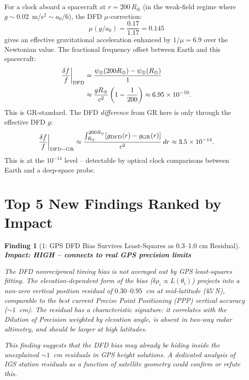 \documentclass[aps,prd,twocolumn,superscriptaddress,nofootinbib]{revtex4-2}
\newtheorem{finding}{Finding}
\begin{document}
For a clock aboard a spacecraft at $r = 200\,R_\oplus$ (in the weak-field
regime where $g \sim 0.02$~m/s$^2 \sim a_0/6$), the DFD $\mu$-correction:
\begin{equation}
\mu(g/a_0) = \frac{0.17}{1.17} = 0.145
\end{equation}
gives an effective gravitational acceleration enhanced by $1/\mu = 6.9$
over the Newtonian value. The fractional frequency offset between Earth
and this spacecraft:
\begin{align}
\frac{\delta f}{f}\bigg|_{\rm DFD}
&= \frac{\psi_\oplus(200R_\oplus) - \psi_\oplus(R_\oplus)}{1} \nonumber\\
&\approx \frac{g R_\oplus}{c^2}
  \left(1 - \frac{1}{200}\right)
  \approx 6.95\times10^{-10}.
\end{align}
This is GR-standard. The DFD \emph{difference} from GR here is only
through the effective DFD $g$:
\begin{equation}
\frac{\delta f}{f}\bigg|_{\rm DFD-GR}
\approx \frac{\int_{R_\oplus}^{200R_\oplus}[g_{\rm DFD}(r) - g_{\rm GR}(r)]}{c^2}\,dr
\approx 3.5\times10^{-14}.
\end{equation}
This is at the $10^{-14}$ level -- detectable by optical clock
comparisons between Earth and a deep-space probe.

\section{Top 5 New Findings Ranked by Impact}

\begin{finding}[1: GPS DFD Bias Survives Least-Squares as 0.3--1.0 cm Residual]
\label{find:1}
\textbf{Impact: HIGH -- connects to real GPS precision limits}

The DFD nonreciprocal timing bias is \emph{not} averaged out by GPS
least-squares fitting. The elevation-dependent form of the bias
($\delta\rho_i \propto L(\theta_i)$) projects into a non-zero vertical
position residual of $0.30$--$0.95$~cm at mid-latitude ($45^\circ$N),
comparable to the best current Precise Point Positioning (PPP) vertical
accuracy ($\sim 1$~cm). The residual has a characteristic signature:
it correlates with the \emph{Dilution of Precision} weighted by elevation angle,
is absent in two-way radar altimetry, and should be larger at high latitudes.

This finding suggests that the DFD bias may already be hiding inside
the unexplained $\sim 1$~cm residuals in GPS height solutions. A dedicated
analysis of IGS station residuals as a function of satellite geometry
could confirm or refute this.
\end{finding}
\end{document}
